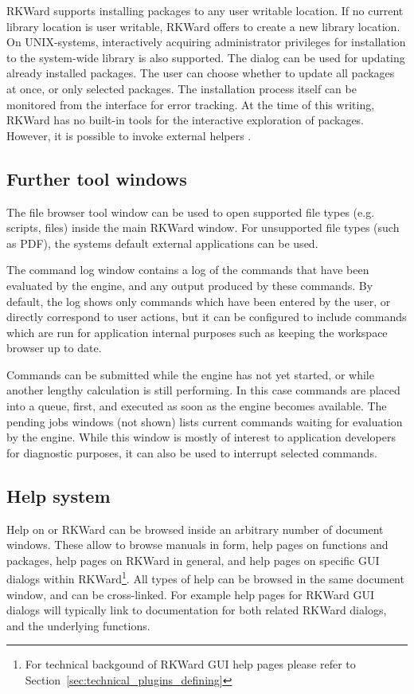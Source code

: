 RKWard supports installing packages to any user writable location. If no current
library location is user writable, RKWard offers to create a new library
location. On UNIX-systems, interactively acquiring administrator privileges for
installation to the system-wide library is also supported. The dialog can be
used for updating already installed packages. The user can choose whether to
update all packages at once, or only selected packages. The installation process
itself can be monitored from the interface for error tracking. At the time of this writing, RKWard has no
built-in tools for the interactive exploration of  packages. However, it is
possible to invoke external helpers \citep{Zhang2004}.

\subsection{Further tool windows}
\label{sec:further_tool_windows}

The file browser tool window can be
used to open supported file types (e.g. 
scripts,  files) inside the main RKWard
window. For unsupported file types (such as PDF), the
systems default external applications can be used.

The command log window contains a log of the commands that have been
evaluated by the  engine, and any output
produced by these commands. By default, the log shows only commands
which have been entered by the user, or directly correspond to user
actions, but it can be configured to include commands which are run for
application internal purposes such as keeping the workspace browser up
to date.

Commands can be submitted while the  engine
has not yet started, or while another lengthy calculation is still
performing. In this case commands are placed into a queue, first, and
executed as soon as the  engine becomes
available. The pending jobs windows (not
shown) lists current  commands waiting for
evaluation by the  engine. While this
window is mostly of interest to application developers for diagnostic
purposes, it can also be used to interrupt selected commands.

\subsection{Help system}
\label{sec:help_system}
Help on 
or RKWard can be browsed inside an arbitrary number of document
windows. These allow to browse  manuals in
 form, help pages on
 functions and packages, help pages on
RKWard in general, and help pages on specific GUI dialogs within
RKWard\footnote{For technical backgound of RKWard GUI help pages 
please refer to Section~\ref{sec:technical_plugins_defining}}. 
All types of help can be browsed in the
same document window, and can be cross-linked. For example help pages for
RKWard GUI dialogs will typically link to documentation for both
related RKWard dialogs, and the underlying
 functions.

